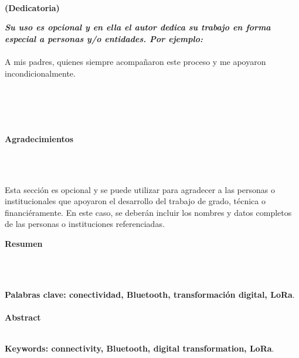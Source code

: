 

\newpage
\thispagestyle{empty} \textbf{}\normalsize
\\\\\\%
\textbf{(Dedicatoria)}\\[4.0cm]

\begin{flushright}
\begin{minipage}{8cm}
    \noindent
        \small
        \textit{\textbf{Su uso es opcional y en ella el autor dedica su trabajo en forma especial a personas y/o entidades. Por ejemplo:}}\\[1.0cm]\\
        A mis padres, quienes siempre acompañaron este proceso y me apoyaron incondicionalmente.\\[1.0cm]\\
\end{minipage}
\end{flushright}



\newpage
\thispagestyle{empty} \textbf{}\normalsize
\\\\\\%
\textbf{\LARGE Agradecimientos}
\\\\

\begin{tcolorbox}[width=\textwidth,colback={white},title={\textbf{Lineamientos de los Agradecimientos}},colbacktitle=black,coltitle=white]    
Esta sección es opcional y se puede utilizar para agradecer a las personas o institucionales que apoyaron el desarrollo del trabajo de grado, técnica o financiéramente. En este caso, se deberán incluir los nombres y datos completos de las personas o instituciones referenciadas.
\end{tcolorbox}    

\lipsum[1-1]

\newpage{\pagestyle{empty}\cleardoublepage}


\newpage
\textbf{\LARGE Resumen}
\\\\
\lipsum[2-3]

\textbf{\small Palabras clave: conectividad, Bluetooth, transformación digital, LoRa}.\\\\

\textbf{\LARGE Abstract}\\\\
\lipsum[4-5]

\textbf{\small Keywords: connectivity, Bluetooth, digital transformation, LoRa}.
